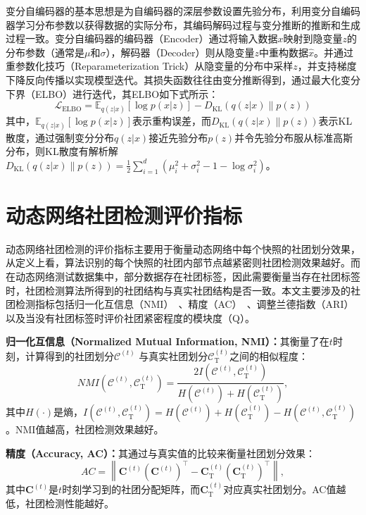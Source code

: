 变分自编码器的基本思想是为自编码器的深层参数设置先验分布，利用变分自编码器学习分布参数以获得数据的实际分布，其编码解码过程与变分推断的推断和生成过程一致。变分自编码器的编码器（Encoder）通过将输入数据$x$映射到隐变量$z$的分布参数（通常是$\mu$和$\sigma$），解码器（Decoder）则从隐变量$z$中重构数据$\hat{x}$。并通过重参数化技巧（Reparameterization Trick）从隐变量的分布中采样$z$，并支持梯度下降反向传播以实现模型迭代。其损失函数往往由变分推断得到，通过最大化变分下界（ELBO）进行迭代，其ELBO如下式所示：
\begin{equation}
	\mathcal{L}_{\text{ELBO}} = \mathbb{E}_{q(z|x)}[\log p(x|z)] - D_{\text{KL}}(q(z|x) \| p(z))
\end{equation}
其中，$\mathbb{E}_{q(z|x)}[\log p(x|z)]$表示重构误差，而$D_{\text{KL}}(q(z|x) \| p(z))$表示KL散度，通过强制变分分布$q(z|x)$接近先验分布$p(z)$并令先验分布服从标准高斯分布，则KL散度有解析解$D_{\text{KL}}(q(z|x) \| p(z))=\frac{1}{2}\sum_{i=1}^{d}(\mu_i^2+\sigma_i^2-1-\log \sigma_i^2)$。

\section{动态网络社团检测评价指标}
\label{chap2:metrics}
动态网络社团检测的评价指标主要用于衡量动态网络中每个快照的社团划分效果，从定义上看，算法识别的每个快照的社团内部节点越紧密则社团检测效果越好。而在动态网络测试数据集中，部分数据存在社团标签，因此需要衡量当存在社团标签时，社团检测算法所得到的社团结构与真实社团结构是否一致。本文主要涉及的社团检测指标包括归一化互信息（NMI）~\cite{gong2007machine}、精度（AC）~\cite{folino2013evolutionary}、调整兰德指数（ARI）\cite{ZHAO2024115482}以及当没有社团标签时评价社团紧密程度的模块度（Q）\cite{zhang2024inductive}。

\textbf{归一化互信息（Normalized Mutual Information,  NMI）：}其衡量了在$t$时刻，计算得到的社团划分$\mathcal{C}^{(t)}$ 与真实社团划分$\mathcal{C}_{\mathrm{T}}^{(t)}$之间的相似程度：
     \begin{equation}
          NMI(\mathcal{C}^{(t)},\mathcal{C}_{\mathrm{T}}^{(t)})= \frac{2I(\mathcal{C}^{(t)},\mathcal{C}_{\mathrm{T}}^{(t)})}{H(\mathcal{C}^{(t)})+H(\mathcal{C}_{\mathrm{T}}^{(t)})},
      \end{equation}
其中$H(\cdot)$是熵，$I(\mathcal{C}^{(t)},\mathcal{C}_{\mathrm{T}}^{(t)}) = H(\mathcal{C}^{(t)})+H(\mathcal{C}_{\mathrm{T}}^{(t)}) - H(\mathcal{C}^{(t)},\mathcal{C}_{\mathrm{T}}^{(t)})$。NMI值越高，社团检测效果越好。

\textbf{精度（Accuracy, AC）：}其通过与真实值的比较来衡量社团划分效果：
     \begin{equation}
       AC = \left \| \mathbf{C}^{(t)}(\mathbf{C}^{(t)})^{\top}-\mathbf{C}_{\mathrm{T}}^{(t)}(\mathbf{C}_{\mathrm{T}}^{(t)})^{\top} \right \|,
      \end{equation}
其中$\mathbf{C}^{(t)}$是$t$时刻学习到的社团分配矩阵，而$\mathbf{C}_{\mathrm{T}}^{(t)}$对应真实社团划分。AC值越低，社团检测性能越好。


